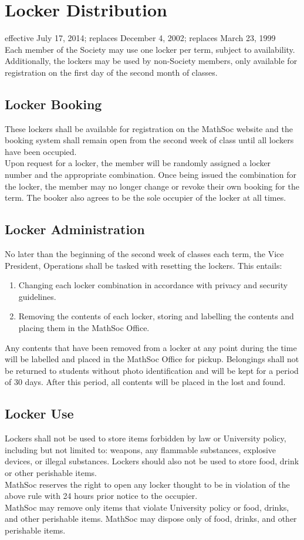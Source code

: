 \section{Locker Distribution}
effective July 17, 2014; replaces December 4, 2002; replaces March 23, 1999\\

Each member of the Society may use one locker per term, subject to availability. Additionally, the lockers may be used by non-Society members, only available for registration on the first day of the second month of classes.

\subsection{Locker Booking}
These lockers shall be available for registration on the MathSoc website and the booking system shall remain open from the second week of class until all lockers have been occupied.\\
Upon request for a locker, the member will be randomly assigned a locker number and the appropriate combination. Once being issued the combination for the locker, the member may no longer change or revoke their own booking for the term. The booker also agrees to be the sole occupier of the locker at all times.

\subsection{Locker Administration}
No later than the beginning of the second week of classes each term, the Vice President, Operations shall be tasked with resetting the lockers. This entails:
\begin{enumerate}
\item Changing each locker combination in accordance with privacy and security guidelines.
\item Removing the contents of each locker, storing and labelling the contents and placing them in the MathSoc Office.
\end{enumerate}
Any contents that have been removed from a locker at any point during the time will be labelled and placed in the MathSoc Office for pickup. Belongings shall not be returned to students without photo identification and will be kept for a period of 30 days. After this period, all contents will be placed in the lost and found.

\subsection{Locker Use}
Lockers shall not be used to store items forbidden by law or University policy, including but not limited to: weapons, any flammable substances, explosive devices, or illegal substances. Lockers should also not be used to store food, drink or other perishable items.\\
MathSoc reserves the right to open any locker thought to be in violation of the above rule with 24 hours prior notice to the occupier.\\
MathSoc may remove only items that violate University policy or food, drinks, and other perishable items. MathSoc may dispose only of food, drinks, and other perishable items.
